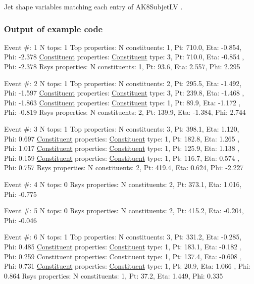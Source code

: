 Jet shape variables matching each entry of A\-K8\-Subjet\-L\-V .

\subsubsection*{Output of example code}


\begin{DoxyCode}
Event #: 1
      N tops: 1
      Top properties: N constituents:   1,   Pt:  710.0,   Eta:  -0.854,   Phi:  -2.378
          \hyperlink{classConstituent}{Constituent} properties: \hyperlink{classConstituent}{Constituent} type:   3,   Pt:  710.0,   Eta:  -0.854
      ,   Phi:  -2.378
      Rsys properties: N constituents:   1,   Pt:   93.6,   Eta:   2.557,   Phi:   2.295

Event #: 2
      N tops: 1
      Top properties: N constituents:   2,   Pt:  295.5,   Eta:  -1.492,   Phi:  -1.597
          \hyperlink{classConstituent}{Constituent} properties: \hyperlink{classConstituent}{Constituent} type:   3,   Pt:  239.8,   Eta:  -1.468
      ,   Phi:  -1.863
          \hyperlink{classConstituent}{Constituent} properties: \hyperlink{classConstituent}{Constituent} type:   1,   Pt:   89.9,   Eta:  -1.172
      ,   Phi:  -0.819
      Rsys properties: N constituents:   2,   Pt:  139.9,   Eta:  -1.384,   Phi:   2.744

Event #: 3
      N tops: 1
      Top properties: N constituents:   3,   Pt:  398.1,   Eta:   1.120,   Phi:   0.697
          \hyperlink{classConstituent}{Constituent} properties: \hyperlink{classConstituent}{Constituent} type:   1,   Pt:  182.8,   Eta:   1.265
      ,   Phi:   1.017
          \hyperlink{classConstituent}{Constituent} properties: \hyperlink{classConstituent}{Constituent} type:   1,   Pt:  125.9,   Eta:   1.138
      ,   Phi:   0.159
          \hyperlink{classConstituent}{Constituent} properties: \hyperlink{classConstituent}{Constituent} type:   1,   Pt:  116.7,   Eta:   0.574
      ,   Phi:   0.757
      Rsys properties: N constituents:   2,   Pt:  419.4,   Eta:   0.624,   Phi:  -2.227

Event #: 4
      N tops: 0
      Rsys properties: N constituents:   2,   Pt:  373.1,   Eta:   1.016,   Phi:  -0.775

Event #: 5
      N tops: 0
      Rsys properties: N constituents:   2,   Pt:  415.2,   Eta:  -0.204,   Phi:  -0.046

Event #: 6
      N tops: 1
      Top properties: N constituents:   3,   Pt:  331.2,   Eta:  -0.285,   Phi:   0.485
          \hyperlink{classConstituent}{Constituent} properties: \hyperlink{classConstituent}{Constituent} type:   1,   Pt:  183.1,   Eta:  -0.182
      ,   Phi:   0.259
          \hyperlink{classConstituent}{Constituent} properties: \hyperlink{classConstituent}{Constituent} type:   1,   Pt:  137.4,   Eta:  -0.608
      ,   Phi:   0.731
          \hyperlink{classConstituent}{Constituent} properties: \hyperlink{classConstituent}{Constituent} type:   1,   Pt:   20.9,   Eta:   1.066
      ,   Phi:   0.864
      Rsys properties: N constituents:   1,   Pt:   37.2,   Eta:   1.449,   Phi:   0.335


\end{DoxyCode}
